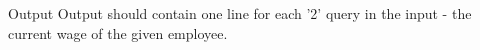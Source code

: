 Output
Output should contain one line for each '2' query in the input - the current wage of the given employee.